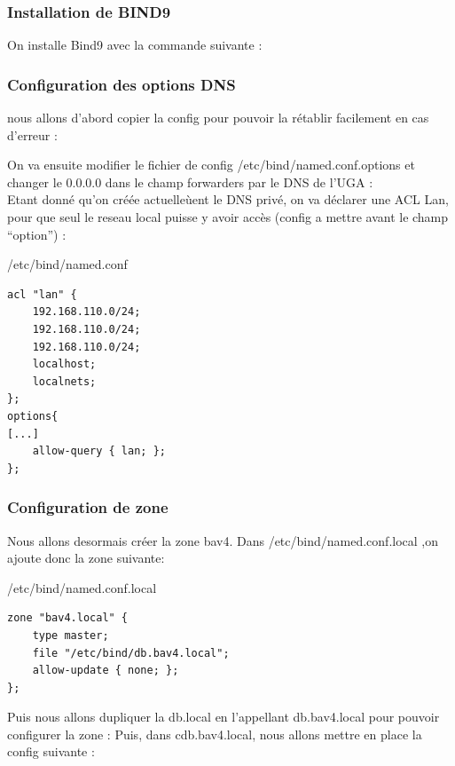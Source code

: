 \documentclass{article}
\begin{document}
\subsubsection{Installation de BIND9}
On installe Bind9 avec la commande suivante :

\subsubsection{Configuration des options DNS}
nous allons d'abord copier la config pour pouvoir la rétablir facilement en cas d'erreur :

On va ensuite modifier le fichier de config /etc/bind/named.conf.options
et changer le 0.0.0.0 dans le champ forwarders par le DNS de l'UGA : \\
Etant donné qu'on créée actuelleùent le DNS privé, on va déclarer une ACL Lan, pour que seul le reseau local puisse y avoir accès (config a mettre avant le champ “option”) :
\begin{configbox}{/etc/bind/named.conf}
\begin{lstlisting}
acl "lan" {
	192.168.110.0/24;
	192.168.110.0/24;
	192.168.110.0/24;
	localhost;
	localnets;
};
options{ 
[...] 
	allow-query { lan; }; 
};
\end{lstlisting}
\end{configbox}

\subsubsection{Configuration de zone}
Nous allons desormais créer la zone bav4. Dans /etc/bind/named.conf.local ,on ajoute donc la zone suivante:

\begin{configbox}{/etc/bind/named.conf.local}
\begin{lstlisting}
zone "bav4.local" {
    type master;
    file "/etc/bind/db.bav4.local";
    allow-update { none; };
};
\end{lstlisting}
\end{configbox}
Puis nous allons dupliquer la db.local en l’appellant db.bav4.local pour pouvoir configurer la zone : 
Puis, dans cdb.bav4.local, nous allons mettre en place la config suivante :
\end{document}
